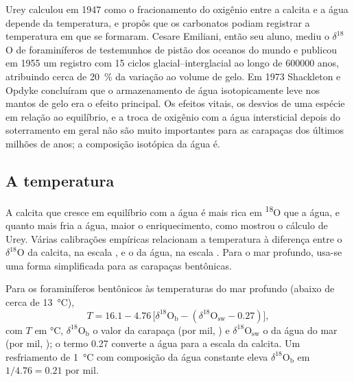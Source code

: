 \begin{history}
Urey calculou em 1947 como o fracionamento do oxigênio entre a calcita e a água depende da
temperatura, e propôs que os carbonatos podiam registrar a temperatura em que se formaram. Cesare
Emiliani, então seu aluno, mediu o $\delta^{18}$O de foraminíferos de testemunhos de pistão dos
oceanos do mundo e publicou em 1955 um registro com 15 ciclos glacial--interglacial ao longo de
\num{600000} anos, atribuindo cerca de \qty{20}{\percent} da variação ao volume de gelo.
Em 1973 Shackleton e Opdyke concluíram que o armazenamento de água isotopicamente leve nos
mantos de gelo era o efeito principal. Os efeitos vitais, os desvios de uma espécie em relação ao equilíbrio,
e a troca de oxigênio com a água intersticial depois do soterramento em geral não são muito importantes para as
carapaças dos últimos milhões de anos; a composição isotópica da água é.
\end{history}

\subsection*{A temperatura}

A calcita que cresce em equilíbrio com a água é mais rica em \textsuperscript{18}O que a água,
e quanto mais fria a água, maior o enriquecimento, como mostrou o cálculo de Urey. Várias
calibrações empíricas relacionam
a temperatura à diferença entre o $\delta^{18}$O da calcita, na escala , e
o da água, na escala . Para o mar profundo, usa-se uma forma simplificada para as carapaças
bentônicas.

\begin{proposition}\label{prop:b2:climate-proxies:benthic}
Para os foraminíferos bentônicos às temperaturas do mar profundo (abaixo de cerca de \qty{13}{\celsius}),
\[
  T = 16.1 - 4.76\,\bigl[\delta^{18}\mathrm{O}_{\mathrm{b}} - (\delta^{18}\mathrm{O}_{\mathrm{sw}} -
  0.27)\bigr],
\]
com $T$ em \unit{\celsius}, $\delta^{18}\mathrm{O}_{\mathrm{b}}$ o valor da carapaça (por mil,
) e $\delta^{18}\mathrm{O}_{\mathrm{sw}}$ o da água do mar (por mil, ); o termo
0.27 converte a água para a escala da calcita. Um resfriamento de \qty{1}{\celsius} com composição da
água constante eleva $\delta^{18}\mathrm{O}_{\mathrm{b}}$ em $1/4.76 = 0.21$ por mil.
\end{proposition}
\admitted

